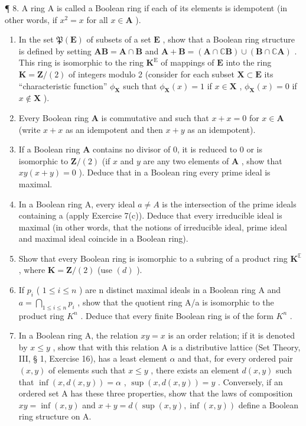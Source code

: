 ¶ 8. A ring A is called a Boolean ring if each of its elements is idempotent (in other words, if \(x^2 = x\) for all \(x \in \mathbf{A}\) ).

\begin{enumerate}
\def\labelenumi{(\alph{enumi})}
\item
  In the set \(\mathfrak{P}(\mathbf{E})\) of subsets of a set \(\mathbf{E}\) , show that a Boolean ring structure is defined by setting \(\mathbf{AB} = \mathbf{A} \cap \mathbf{B}\) and \(\mathbf{A} + \mathbf{B} = (\mathbf{A} \cap \mathbb{C}\mathbf{B}) \cup (\mathbf{B} \cap \mathbb{C}\mathbf{A})\) . This ring is isomorphic to the ring \(\mathbf{K}^{\mathrm{E}}\) of mappings of \(\mathbf{E}\) into the ring \(\mathbf{K} = \mathbf{Z}/(2)\) of integers modulo 2 (consider for each subset \(\mathbf{X} \subset \mathbf{E}\) its ``characteristic function'' \(\phi_{\mathbf{X}}\) such that \(\phi_{\mathbf{X}}(x) = 1\) if \(x \in \mathbf{X}\) , \(\phi_{\mathbf{X}}(x) = 0\) if \(x \notin \mathbf{X}\) ).
\item
  Every Boolean ring \(\mathbf{A}\) is commutative and such that \(x + x = 0\) for \(x \in \mathbf{A}\) (write \(x + x\) as an idempotent and then \(x + y\) as an idempotent).
\item
  If a Boolean ring \(\mathbf{A}\) contains no divisor of 0, it is reduced to 0 or is isomorphic to \(\mathbf{Z} / (2)\) (if \(x\) and \(y\) are any two elements of \(\mathbf{A}\) , show that \(xy(x + y) = 0\) ). Deduce that in a Boolean ring every prime ideal is maximal.
\item
  In a Boolean ring A, every ideal \(a \neq A\) is the intersection of the prime ideals containing a (apply Exercise 7(c)). Deduce that every irreducible ideal is maximal (in other words, that the notions of irreducible ideal, prime ideal and maximal ideal coincide in a Boolean ring).
\item
  Show that every Boolean ring is isomorphic to a subring of a product ring \(\mathbf{K}^{\mathbb{E}}\) , where \(\mathbf{K} = \mathbf{Z}/(2)\) (use \((d)\) ).
\item
  If \(p_{i}\) ( \(1 \leqslant i \leqslant n\) ) are n distinct maximal ideals in a Boolean ring A and \(a = \bigcap_{1 \leqslant i \leqslant n} p_{i}\) , show that the quotient ring A/a is isomorphic to the product ring \(K^{n}\) . Deduce that every finite Boolean ring is of the form \(K^{n}\) .
\item
  In a Boolean ring A, the relation \(xy = x\) is an order relation; if it is denoted by \(x \leqslant y\) , show that with this relation A is a distributive lattice (Set Theory, III, § 1, Exercise 16), has a least element \(\alpha\) and that, for every ordered pair \((x, y)\) of elements such that \(x \leqslant y\) , there exists an element \(d(x, y)\) such that \(\inf(x, d(x, y)) = \alpha\) , \(\sup(x, d(x, y)) = y\) . Conversely, if an ordered set A has these three properties, show that the laws of composition \(xy = \inf(x, y)\) and \(x + y = d(\sup(x, y), \inf(x, y))\) define a Boolean ring structure on A.
\end{enumerate}

